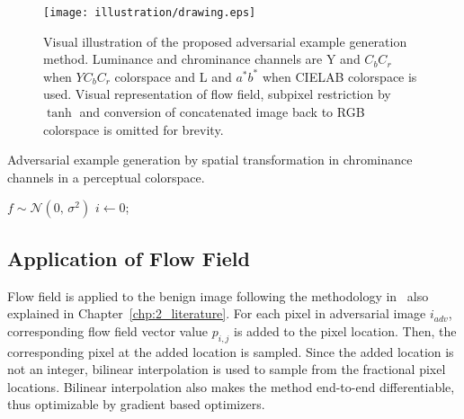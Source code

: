 \begin{figure*}[t]
    \centering
    \texttt{[image: illustration/drawing.eps]}
    \caption[Visual illustration of the proposed adversarial example generation method. ]{Visual illustration of the proposed adversarial example generation method. Luminance and chrominance channels are Y and \(C_{b}C_{r}\) when \(YC_{b}C_{r}\) colorspace and L and \(a^*b^*\) when CIELAB colorspace is used. Visual representation of flow field, subpixel restriction by \(\tanh\) and conversion of concatenated image back to RGB colorspace is omitted for brevity.}\label{fig:algorithm}
\end{figure*}

\begin{algorithm}[t]
    \caption{Adversarial example generation by spatial transformation in chrominance channels in a perceptual colorspace. }\label{alg1}
    \(f \sim \mathcal{N}(0,\,\sigma^{2})\)\;
    \(i \gets 0\);

\end{algorithm}

\subsection{Application of Flow Field}
Flow field is applied to the benign image following the methodology in~\cite{xiao2018spatially} also explained in Chapter~\ref{chp:2_literature}. For each pixel in adversarial image \(i_{adv}\), corresponding flow field vector value \(p_{i,j}\) is added to the pixel location. Then, the corresponding pixel at the added location is sampled. Since the added location is not an integer, bilinear interpolation is used to sample from the fractional pixel locations. Bilinear interpolation also makes the method end-to-end differentiable, thus optimizable by gradient based optimizers.

